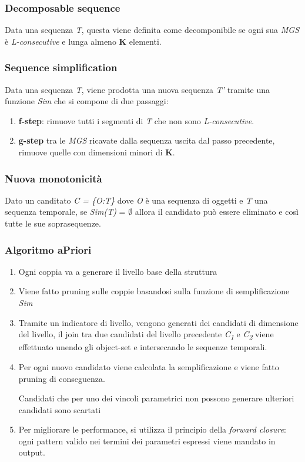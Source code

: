 \documentclass{beamer}
\begin{document}
\begin{frame}
	\frametitle{Decomposable sequence}
	Data una sequenza \textit{T}, questa viene definita come decomponibile se ogni sua \textit{MGS} è \textit{L-consecutive} e lunga almeno \textbf{K} elementi.
\end{frame}

\begin{frame}
	\frametitle{Sequence simplification}
	Data una sequenza \textit{T}, viene prodotta una nuova sequenza \textit{T'} tramite una funzione \textit{Sim} che si compone di due passaggi: 
	\begin{enumerate}
		\item \textbf{f-step}: rimuove tutti i segmenti di \textit{T} che non sono \textit{L-consecutive}.
		\item \textbf{g-step} tra le \textit{MGS} ricavate dalla sequenza uscita dal passo precedente, rimuove quelle con dimensioni minori di \textbf{K}.
	\end{enumerate}
\end{frame}

\begin{frame}
	\frametitle{Nuova monotonicità}
   Dato un canditato \textit{C = \{O:T\}} dove \textit{O} è una sequenza di oggetti e \textit{T} una sequenza temporale, se \textit{Sim(T)} = $\emptyset$ allora il candidato può essere eliminato e così tutte le sue soprasequenze.
\end{frame}

\begin{frame}
	\frametitle{Algoritmo aPriori}
	\begin{enumerate}
		\item Ogni coppia va a generare il livello base della struttura
		\item Viene fatto pruning sulle coppie basandosi sulla funzione di semplificazione \textit{Sim}
		\item Tramite un indicatore di livello, vengono generati dei candidati di dimensione del livello, il join tra due candidati del livello precedente \textit{C\textsubscript{1}} e
		 \textit{C\textsubscript{2}} viene effettuato unendo gli object-set e intersecando le sequenze temporali.
		 \item Per ogni nuovo candidato viene calcolata la semplificazione e viene fatto pruning di conseguenza.
		 
		 Candidati che per uno dei vincoli parametrici non possono generare ulteriori candidati sono scartati
		 
		 \item Per migliorare le performance, si utilizza il principio della \textit{forward closure}: ogni pattern valido nei termini dei parametri espressi viene mandato in output.
	\end{enumerate}
\end{frame}
\end{document}
